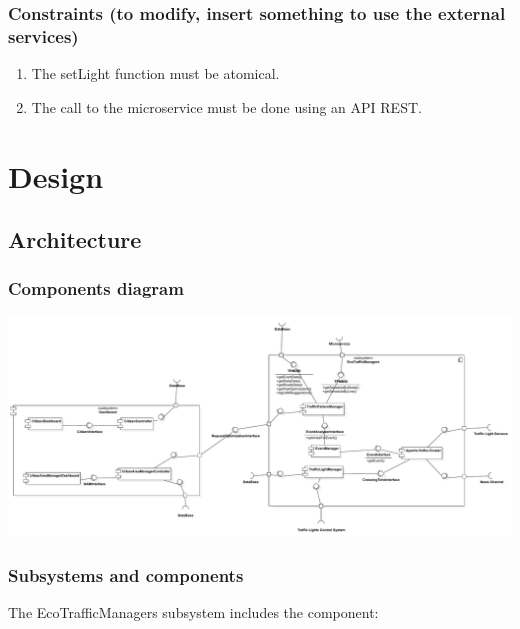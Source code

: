 \documentclass[12pt, a4paper, twoside, openright]{report}
\begin{document}
\subsection{Constraints (to modify, insert something to use the
external services)}

\begin{enumerate}
\item
  The setLight function must be atomical.
\item
  The call to the microservice must be done using an API REST.
\end{enumerate}

\chapter{Design}

\section{Architecture}
\subsection{Components diagram}

\includegraphics[width=\linewidth]{images/svg/component_diagram.pdf}

\subsection{Subsystems and components}

The EcoTrafficManagers subsystem includes the component:
\end{document}
